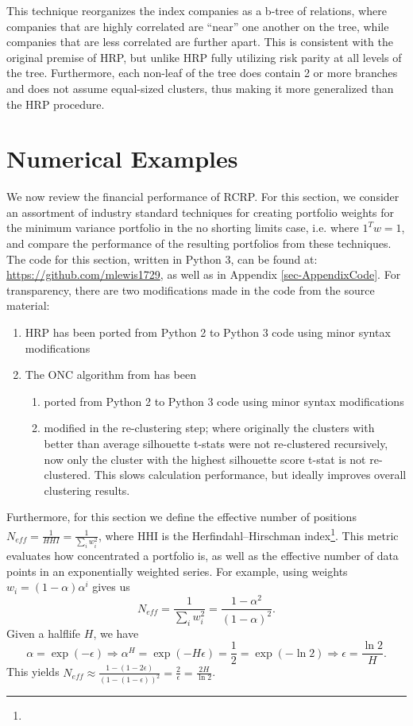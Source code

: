\documentclass[10pt,twoside,titlepage]{article}   %
\begin{document}
This technique reorganizes the index companies as a b-tree of relations, where companies that are highly correlated are “near” one another on the tree, 
while companies that are less correlated are further apart. 
This is consistent with the original premise of HRP, but unlike HRP fully utilizing risk parity at all levels of the tree. 
Furthermore, each non-leaf of the tree does contain 2 or more branches and does not assume equal-sized clusters, thus making it more generalized than the HRP procedure.

\section{Numerical Examples}\label{sec-Simulation}
We now review the financial performance of RCRP. 
For this section, we consider an assortment of industry standard techniques for creating portfolio weights for the minimum variance portfolio in the no shorting limits case, i.e. where $1^Tw=1$, 
and compare the performance of the resulting portfolios from these techniques. 
The code for this section, written in Python 3, can be found at: \url{https://github.com/mlewis1729}, as well as in Appendix \ref{sec-AppendixCode}.
For transparency, there are two modifications made in the code from the source material:
\begin{enumerate}
\item HRP has been ported from Python 2 to Python 3 code using minor syntax modifications
\item The ONC algorithm from \cite{LopezAndLewis} has been
\begin{enumerate}
\item ported from Python 2 to Python 3 code using minor syntax modifications
\item modified in the re-clustering step; where originally the clusters with better than average silhouette t-stats were not re-clustered recursively, 
now only the cluster with the highest silhouette score t-stat is not re-clustered. This slows calculation performance, but ideally improves overall clustering results.
\end{enumerate}
\end{enumerate}
Furthermore, for this section we define the effective number of positions $N_{eff}=\frac{1}{HHI}=\frac{1}{\sum_i w_i^2}$, where HHI is the Herfindahl–Hirschman index\footnote{\HHIURL}.
This metric evaluates how concentrated a portfolio is, as well as the effective number of data points in an exponentially weighted series.
For example, using weights $w_i = (1-\alpha) \alpha^i$ gives us
\[
N_{eff} = \frac{1}{\sum_i w_i^2} = \frac{ 1 - \alpha^2 }{ (1 - \alpha)^2 }.
\]
Given a halflife $H$, we have 
\[
\alpha = \exp(-\epsilon) \Rightarrow \alpha^H = \exp(-H \epsilon ) = \frac{1}{2} = \exp( - \ln 2 ) \Rightarrow \epsilon = \frac{ \ln 2 }{ H }.
\]
This yields $N_{eff} \approx \frac{ 1 - ( 1 - 2 \epsilon ) }{ ( 1 - (1-\epsilon) )^2 } = \frac{ 2 }{ \epsilon } = \frac{ 2 H }{ \ln 2 }$.
\end{document}
